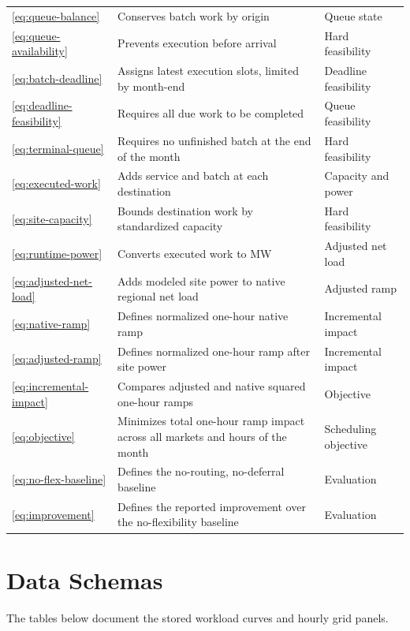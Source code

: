 \documentclass[conference]{IEEEtran}
\begin{document}
\begin{longtable}{@{}L{0.16\textwidth}L{0.50\textwidth}L{0.26\textwidth}@{}}
  \eqref{eq:queue-balance}
    & Conserves batch work by origin
    & Queue state \\
  \eqref{eq:queue-availability}
    & Prevents execution before arrival
    & Hard feasibility \\
  \eqref{eq:batch-deadline}
    & Assigns latest execution slots, limited by month-end
    & Deadline feasibility \\
  \eqref{eq:deadline-feasibility}
    & Requires all due work to be completed
    & Queue feasibility \\
  \eqref{eq:terminal-queue}
    & Requires no unfinished batch at the end of the month
    & Hard feasibility \\
  \eqref{eq:executed-work}
    & Adds service and batch at each destination
    & Capacity and power \\
  \eqref{eq:site-capacity}
    & Bounds destination work by standardized capacity
    & Hard feasibility \\
  \eqref{eq:runtime-power}
    & Converts executed work to MW
    & Adjusted net load \\
  \eqref{eq:adjusted-net-load}
    & Adds modeled site power to native regional net load
    & Adjusted ramp \\
  \eqref{eq:native-ramp}
    & Defines normalized one-hour native ramp
    & Incremental impact \\
  \eqref{eq:adjusted-ramp}
    & Defines normalized one-hour ramp after site power
    & Incremental impact \\
  \eqref{eq:incremental-impact}
    & Compares adjusted and native squared one-hour ramps
    & Objective \\
  \eqref{eq:objective}
    & Minimizes total one-hour ramp impact across all markets and hours of the month
    & Scheduling objective \\
  \eqref{eq:no-flex-baseline}
    & Defines the no-routing, no-deferral baseline
    & Evaluation \\
  \eqref{eq:improvement}
    & Defines the reported improvement over the no-flexibility baseline
    & Evaluation \\
  \bottomrule
\end{longtable}
\endgroup

\clearpage
\section{Data Schemas}
\label{app:data-schemas}

The tables below document the stored workload curves and hourly grid panels.
\end{document}
